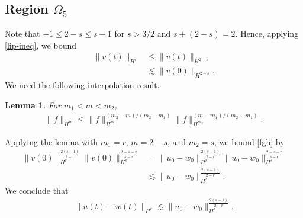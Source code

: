 \documentclass[12pt,reqno]{amsart}
\numberwithin{equation}{section}  %
\numberwithin{figure}{section}
\newtheorem{lemma}[theorem]{Lemma}
\begin{document}
\subsection{Region $\Omega_{5}$} 
\label{ssec:case-4}
%
%
Note that   $-1 \le 2-s \le s-1$ for $s>3/2$ and $s + (2-s) = 2$.
Hence, applying \eqref{lip-ineq}, we bound 
%
%
%
%
\begin{equation}
  \label{fgh}
\begin{split}
  \| v(t) \|_{H^{r}}
  & \le \|v(t) \|_{H^{2-s}}
  \\
  & \lesssim \|v(0) \|_{H^{2-s}}.
  \end{split}
\end{equation}
%
We need the following interpolation
result. 
%
%
%
%
%
%
%
%
\begin{lemma}
  For $m_{1} < m < m_{2}$,
  \begin{equation*}
  \begin{split}
    \| f \|_{H^{m}} \le \| f \|_{H^{m_{1}}}^{(m_{2}-m)/(m_{2} - m_{1})} \| f
    \|_{H^{m_{2}}}^{(m -m_{1})/(m_{2} - m_{1})}.
  \end{split}
  \end{equation*}
\label{lem:interp}
\end{lemma}
%
Applying the lemma with $m_{1} =r$, $m = 2-s$, and $m_{2} = s$, we bound \eqref{fgh} by
%
%
\begin{equation*}
\begin{split}
  \| v(0) \|_{H^{r}}^{\frac{2(s-1)}{2-r}} \|v(0)
  \|_{H^{s}}^{\frac{2-s-r}{s-r}}
  & = \| u_{0} - w_{0} \|_{H^{r}}^{\frac{2(s-1)}{2-r}} \|u_{0} - w_{0}
  \|_{H^{s}}^{\frac{2-s-r}{s-r}}
  \\
  & \lesssim \| u_{0} - w_{0} \|_{H^{r}}^{\frac{2(s-1)}{2-r}}.
\end{split}
\end{equation*}
%
We conclude that
%
%
\begin{equation*}
\begin{split}
  \| u(t) - w(t) \|_{H^{r}} \lesssim \|u_{0} - w_{0} \|_{H^{r}}^{\frac{2(s-1)}{2-r}}.
\end{split}
\end{equation*}
%
%
%
%
\end{document}
